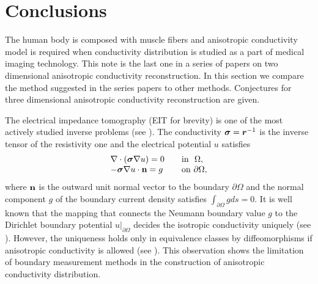 \documentclass[11pt]{amsart}
\theoremstyle{plain}
\numberwithin{equation}{section}
\numberwithin{Thm}{section}
\def\r{{\bf r}}
\def\n{{\bf n}}
\def\Sigma{\mbox{\boldmath$\sigma$}}
\def\r{\mbox{\boldmath$r$}}
\begin{document}
\section{Conclusions}\label{sect.con}

The human body is composed with muscle fibers and anisotropic conductivity model is required when conductivity distribution is studied as a part of medical imaging technology. This note is the last one in a series of papers on two dimensional anisotropic conductivity reconstruction. In this section we compare the method suggested in the series papers to other methods. Conjectures for three dimensional anisotropic conductivity reconstruction are given.

The electrical impedance tomography (EIT for brevity) is one of the most actively studied inverse problems (see \cite{ammari_mathematical_2009, ammari_reconstruction_2004,0266-5611-25-12-123011}). The conductivity $\Sigma=\r^{-1}$ is the inverse tensor of the resistivity one and the electrical potential $u$ satisfies
\begin{equation}\label{eqn:div}
\begin{array}{ll}
\nabla\cdot(\Sigma\nabla u)=0  &\quad \mbox{in~~} \Omega,\\
-\Sigma\nabla u\cdot\n=g&\quad \mbox{on~} \partial\Omega,\\
\end{array}
\end{equation}
where $\n$ is the outward unit normal vector to the boundary $\partial\Omega$ and the normal component $g$ of the boundary current density satisfies $\int_{\partial\Omega}gds=0$. It is well known that the mapping that connects the Neumann boundary value $g$ to the Dirichlet boundary potential $u|_{\partial\Omega}$ decides the isotropic conductivity uniquely (see \cite{nachman_global_1996,sylvester_global_1987}). However, the uniqueness holds only in equivalence classes by diffeomorphisms if anisotropic conductivity is allowed (see \cite{MR1955896}). This observation shows the limitation of boundary measurement methods in the construction of anisotropic conductivity distribution.
\end{document}
